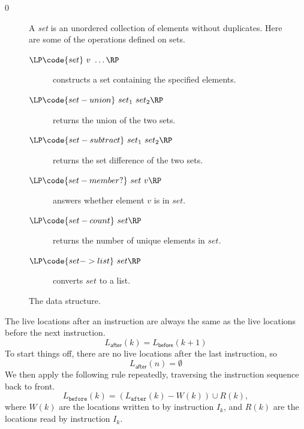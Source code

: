 \documentclass[7x10]{TimesAPriori_MIT}%
\def\racketEd{0}
\def\edition{0}
\numberwithin{theorem}{chapter}
\numberwithin{definition}{chapter}
\numberwithin{equation}{chapter}
\begin{document}
{\if\edition\racketEd
\begin{figure}[tp]
  \small
  \begin{tcolorbox}[title=\href{https://docs.racket-lang.org/reference/sets.html}{The Racket Set Package}]
    A \emph{set} is an unordered collection of elements without duplicates.
    Here are some of the operations defined on sets.
  \begin{description}
  \item[$\LP\code{set}~v~\ldots\RP$] constructs a set containing the specified elements.
  \item[$\LP\code{set-union}~set_1~set_2\RP$] returns the union of the two sets.
  \item[$\LP\code{set-subtract}~set_1~set_2\RP$] returns the set
    difference of the two sets.
  \item[$\LP\code{set-member?}~set~v\RP$] answers whether element $v$ is in $set$.
  \item[$\LP\code{set-count}~set\RP$] returns the number of unique elements in $set$.
  \item[$\LP\code{set->list}~set\RP$] converts $set$ to a list.
  \end{description}
  \end{tcolorbox}
  \caption{The  data structure.}
  \label{fig:set}
\end{figure}
\fi}

The live locations after an instruction are always the same as the
live locations before the next instruction.
 
\begin{equation} \label{eq:live-after-before-next}
  L_{\mathsf{after}}(k) = L_{\mathsf{before}}(k+1)
\end{equation}
To start things off, there are no live locations after the last
instruction, so
\begin{equation}\label{eq:live-last-empty}
  L_{\mathsf{after}}(n) = \emptyset
\end{equation}
We then apply the following rule repeatedly, traversing the
instruction sequence back to front.
\begin{equation}\label{eq:live-before-after-minus-writes-plus-reads}
  L_{\mathtt{before}}(k) = (L_{\mathtt{after}}(k) - W(k)) \cup R(k),
\end{equation}
where $W(k)$ are the locations written to by instruction $I_k$, and
$R(k)$ are the locations read by instruction $I_k$.
\end{document}
